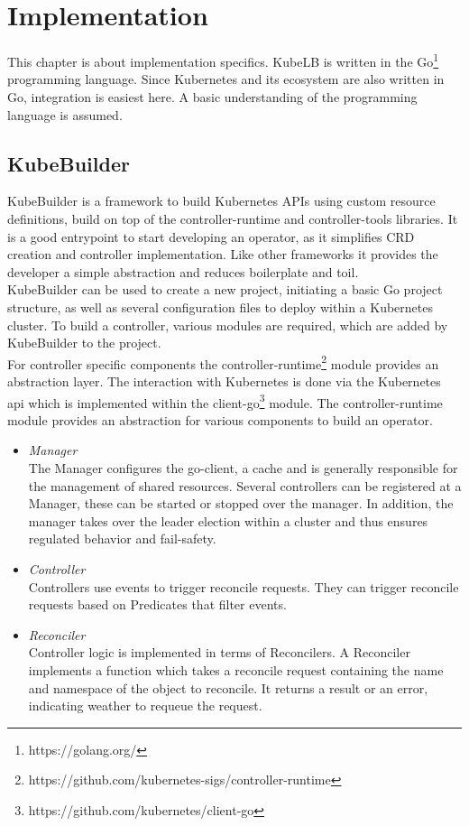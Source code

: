\chapter{Implementation}

This chapter is about implementation specifics.
KubeLB is written in the Go\footnote{https://golang.org/} programming language.
Since Kubernetes and its ecosystem are also written in Go, integration is easiest here.
A basic understanding of the programming language is assumed.

\section{KubeBuilder}

KubeBuilder is a framework to build Kubernetes APIs using custom resource definitions, build on top of the controller-runtime and controller-tools libraries.
It is a good entrypoint to start developing an operator, as it simplifies CRD creation and controller implementation.
Like other frameworks it provides the developer a simple abstraction and reduces boilerplate and toil.
\\
KubeBuilder can be used to create a new project, initiating a basic Go project structure, as well as several configuration files to deploy within a Kubernetes cluster.
To build a controller, various modules are required, which are added by KubeBuilder to the project.
\\
\newpage
For controller specific components the controller-runtime\footnote{https://github.com/kubernetes-sigs/controller-runtime} module provides an abstraction layer.
The interaction with Kubernetes is done via the Kubernetes api which is implemented within the client-go\footnote{https://github.com/kubernetes/client-go} module.
The controller-runtime module provides an abstraction for various components to build an operator.

\begin{itemize}
    \item \textit{Manager} \\
    The Manager configures the go-client, a cache and is generally responsible for the management of shared resources.
    Several controllers can be registered at a Manager, these can be started or stopped over the manager.
    In addition, the manager takes over the leader election within a cluster and thus ensures regulated behavior and fail-safety.
    \item \textit{Controller} \\
    Controllers use events to trigger reconcile requests.
    They can trigger reconcile requests based on Predicates that filter events.
    \item \textit{Reconciler} \\
    Controller logic is implemented in terms of Reconcilers.
    A Reconciler implements a function which takes a reconcile request containing the name and namespace of the object to reconcile.
    It returns a result or an error, indicating weather to requeue the request.
\end{itemize}

